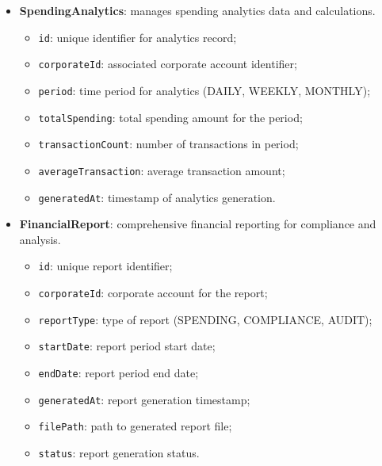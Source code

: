 \begin{itemize}[nosep,leftmargin=*,label=—]
  \item \textbf{SpendingAnalytics}: manages spending analytics data and calculations.
    \begin{itemize}[nosep,leftmargin=*]
      \item \texttt{id}: unique identifier for analytics record;
      \item \texttt{corporateId}: associated corporate account identifier;
      \item \texttt{period}: time period for analytics (DAILY, WEEKLY, MONTHLY);
      \item \texttt{totalSpending}: total spending amount for the period;
      \item \texttt{transactionCount}: number of transactions in period;
      \item \texttt{averageTransaction}: average transaction amount;
      \item \texttt{generatedAt}: timestamp of analytics generation.
    \end{itemize}

  \item \textbf{FinancialReport}: comprehensive financial reporting for compliance and analysis.
    \begin{itemize}[nosep,leftmargin=*]
      \item \texttt{id}: unique report identifier;
      \item \texttt{corporateId}: corporate account for the report;
      \item \texttt{reportType}: type of report (SPENDING, COMPLIANCE, AUDIT);
      \item \texttt{startDate}: report period start date;
      \item \texttt{endDate}: report period end date;
      \item \texttt{generatedAt}: report generation timestamp;
      \item \texttt{filePath}: path to generated report file;
      \item \texttt{status}: report generation status.
    \end{itemize}
\end{itemize}


